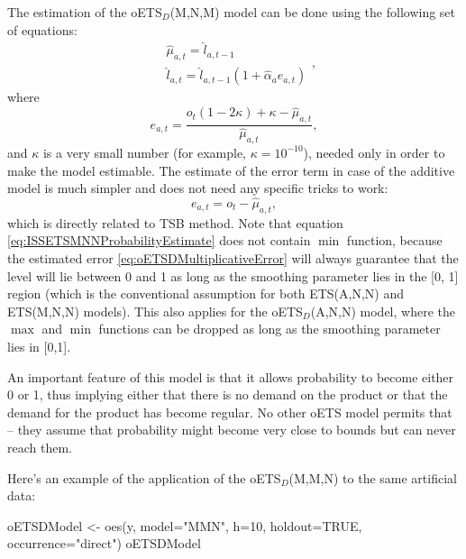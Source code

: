 \documentclass[
]{book}
\newenvironment{Shaded}{\begin{snugshade}}{\end{snugshade}}
\newcommand{\AttributeTok}[1]{\textcolor[rgb]{0.77,0.63,0.00}{#1}}
\newcommand{\ConstantTok}[1]{\textcolor[rgb]{0.00,0.00,0.00}{#1}}
\newcommand{\DecValTok}[1]{\textcolor[rgb]{0.00,0.00,0.81}{#1}}
\newcommand{\FunctionTok}[1]{\textcolor[rgb]{0.00,0.00,0.00}{#1}}
\newcommand{\NormalTok}[1]{#1}
\newcommand{\OtherTok}[1]{\textcolor[rgb]{0.56,0.35,0.01}{#1}}
\newcommand{\StringTok}[1]{\textcolor[rgb]{0.31,0.60,0.02}{#1}}
\theoremstyle{definition}
\theoremstyle{definition}
\theoremstyle{definition}
\theoremstyle{definition}
\theoremstyle{remark}
\begin{document}
The estimation of the oETS\(_D\)(M,N,M) model can be done using the following set of equations:
\begin{equation}
    \begin{aligned}
        & \hat{\mu}_{a,t} = \hat{l}_{a,t-1} \\
        & \hat{l}_{a,t} = \hat{l}_{a,t-1}( 1  + \hat{\alpha}_{a} e_{a,t})
    \end{aligned},
  \label{eq:ISSETSMNNProbabilityEstimate}
\end{equation}
where
\begin{equation}
    e_{a,t} = \frac{o_t (1 -2 \kappa) + \kappa -\hat{\mu}_{a,t}}{\hat{\mu}_{a,t}},
  \label{eq:oETSDMultiplicativeError}
\end{equation}
and \(\kappa\) is a very small number (for example, \(\kappa = 10^{-10}\)), needed only in order to make the model estimable. The estimate of the error term in case of the additive model is much simpler and does not need any specific tricks to work:
\begin{equation}
    e_{a,t} = o_t -\hat{\mu}_{a,t} ,
  \label{eq:oETSDAdditiveError}
\end{equation}
which is directly related to TSB method. Note that equation \eqref{eq:ISSETSMNNProbabilityEstimate} does not contain \(\min\) function, because the estimated error \eqref{eq:oETSDMultiplicativeError} will always guarantee that the level will lie between 0 and 1 as long as the smoothing parameter lies in the {[}0, 1{]} region (which is the conventional assumption for both ETS(A,N,N) and ETS(M,N,N) models). This also applies for the oETS\(_D\)(A,N,N) model, where the \(\max\) and \(\min\) functions can be dropped as long as the smoothing parameter lies in {[}0,1{]}.

An important feature of this model is that it allows probability to become either 0 or 1, thus implying either that there is no demand on the product or that the demand for the product has become regular. No other oETS model permits that -- they assume that probability might become very close to bounds but can never reach them.

Here's an example of the application of the oETS\(_D\)(M,M,N) to the same artificial data:

\begin{Shaded}
\begin{Highlighting}[]
\NormalTok{oETSDModel }\OtherTok{\textless{}{-}} \FunctionTok{oes}\NormalTok{(y, }\AttributeTok{model=}\StringTok{"MMN"}\NormalTok{, }\AttributeTok{h=}\DecValTok{10}\NormalTok{, }\AttributeTok{holdout=}\ConstantTok{TRUE}\NormalTok{,}
                  \AttributeTok{occurrence=}\StringTok{"direct"}\NormalTok{)}
\NormalTok{oETSDModel}
\end{Highlighting}
\end{Shaded}
\end{document}
